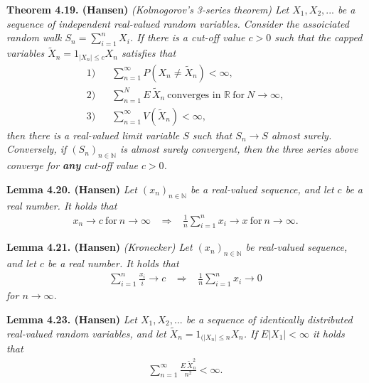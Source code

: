 \documentclass[a4paper,10pt,openany]{book}
\begin{document}
\textbf{Theorem 4.19. (Hansen)} \emph{(Kolmogorov's 3-series theorem) Let \(X_1,X_2,...\) be a sequence of independent real-valued random variables. Consider the assoiciated random walk \(S_n=\sum_{i=1}^n X_i\). If there is a cut-off value \(c>0\) such that the capped variables \(\tilde{X}_n=1_{\vert X_n\vert \le c}X_n\) satisfies that}
\begin{align*}
    \text{1)}\hspace{10pt}& \sum_{n=1}^\infty P(X_n\ne \tilde{X}_n)<\infty,\\
    \text{2)}\hspace{10pt}& \sum_{n=1}^N E\, \tilde{X}_n\ \text{converges in }\mathbb{R}\ \text{for}\ N\to \infty,\\
    \text{3)}\hspace{10pt}& \sum_{n=1}^\infty V(\tilde{X}_n)<\infty,
\end{align*}
\emph{then there is a real-valued limit variable \(S\) such that \(S_n\to S\) almost surely.}
\emph{Conversely, if \((S_n)_{n\in\mathbb{N}}\) is almost surely convergent, then the three series above converge for \textbf{any} cut-off value \(c>0\).}

\textbf{Lemma 4.20. (Hansen)} \emph{Let \((x_n)_{n\in\mathbb{N}}\) be a real-valued sequence, and let \(c\) be a real number. It holds that}
\begin{align*}
    x_n\to c\ \text{for}\ n\to \infty \hspace{10pt}\Rightarrow\hspace{10pt} \frac{1}{n}\sum_{i=1}^nx_i\to x\ \text{for}\ n\to\infty.
\end{align*}

\textbf{Lemma 4.21. (Hansen)} \emph{(Kronecker) Let \((x_n)_{n\in\mathbb{N}}\) be real-valued sequence, and let \(c\) be a real number. It holds that}
\begin{align*}
    \sum_{i=1}^n\frac{x_i}{i}\to c \hspace{10pt}\Rightarrow\hspace{10pt} \frac{1}{n}\sum_{i=1}^nx_i\to 0
\end{align*}
\emph{for \(n\to \infty\).}

\textbf{Lemma 4.23. (Hansen)} \emph{Let \(X_1,X_2,...\) be a sequence of identically distributed real-valued random variables, and let \(\tilde{X}_n=1_{(\vert X_n\vert \le n}X_n\). If \(E\vert X_1\vert<\infty\) it holds that}
\begin{align*}
    \sum_{n=1}^\infty\frac{E\ \tilde{X}_n^2}{n^2}<\infty.
\end{align*}
\end{document}
